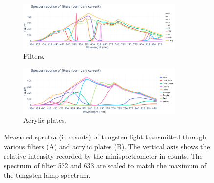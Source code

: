 \begin{figure}[H]
    \centering
    \begin{subfigure}{\textwidth}
        \centering
        \includegraphics[trim=0mm 0mm 0mm 25mm, clip, width=0.9\textwidth]{Figures/C3/filtros_spec.png}
        \caption{Filters.}
        \label{fig:filtros_espectros}
    \end{subfigure}
    \vspace{1em}
    \begin{subfigure}{\textwidth}
        \centering
        \includegraphics[trim=0mm 0mm 0mm 25mm, clip, width=0.9\textwidth]{Figures/C3/laminas_spec.png}
        \caption{Acrylic plates.}
        \label{fig:laminas_espectros}
    \end{subfigure}
    \caption{Measured spectra (in counts) of tungsten light transmitted through various filters (A) and acrylic plates (B). The vertical axis shows the relative intensity recorded by the minispectrometer in counts. The spectrum of filter 532 and 633 are scaled to match the maximum of the tungsten lamp spectrum.}
    \label{fig:espectros_combinados}
\end{figure}

